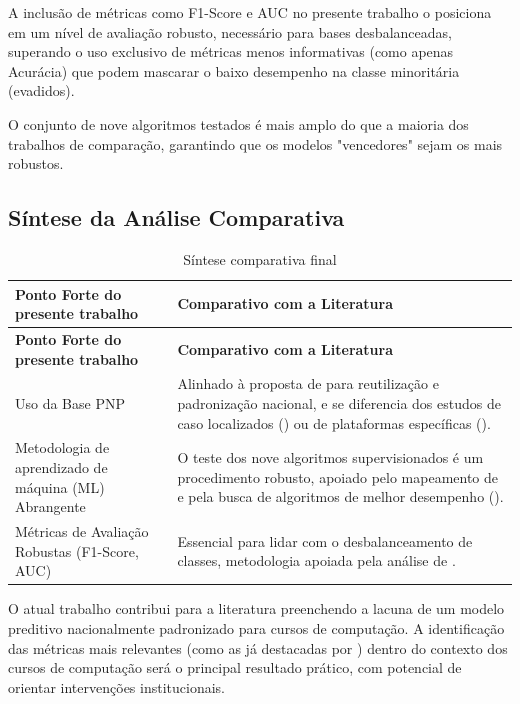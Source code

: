 \documentclass[english, spanish, brazilian]{RBIEarticle} %
\begin{document}
A inclusão de métricas como F1-Score e AUC no presente trabalho o posiciona em um nível de avaliação robusto, necessário para bases desbalanceadas, superando o uso exclusivo de métricas menos informativas (como apenas Acurácia) que podem mascarar o baixo desempenho na classe minoritária (evadidos).

O conjunto de nove algoritmos testados é mais amplo do que a maioria dos trabalhos de comparação, garantindo que os modelos "vencedores" sejam os mais robustos.


\subsection{Síntese da Análise Comparativa}

\begin{longtable}{|p{7cm}|p{8cm}|}
    \caption{Síntese comparativa final}\\
    \toprule
    \textbf{Ponto Forte do presente trabalho} & \textbf{Comparativo com a Literatura} \\
    \midrule
    \endfirsthead
    \toprule
    \textbf{Ponto Forte do presente trabalho} & \textbf{Comparativo com a Literatura} \\
    \midrule
    \endhead
    Uso da Base PNP & Alinhado à proposta de \cite{jesus2024dissertacao} para reutilização e padronização nacional, e se diferencia dos estudos de caso localizados (\cite{ramos2018comparativo}) ou de plataformas específicas (\cite{tamada2025predicting}). \\ \hline

    Metodologia de aprendizado de máquina (ML) Abrangente & O teste dos nove algoritmos supervisionados é um procedimento robusto, apoiado pelo mapeamento de \cite{jesus2024mapeamento} e pela busca de algoritmos de melhor desempenho (\cite{andradegiron2023predicting}). \\ \hline
    
    Métricas de Avaliação Robustas (F1-Score, AUC) & Essencial para lidar com o desbalanceamento de classes, metodologia apoiada pela análise de \cite{neves2024ficare}. \\
    \bottomrule
\end{longtable}

O atual trabalho contribui para a literatura preenchendo a lacuna de um modelo preditivo nacionalmente padronizado para cursos de computação. A identificação das métricas mais relevantes (como as já destacadas por \cite{jesus2024mapeamento}) dentro do contexto dos cursos de computação será o principal resultado prático, com potencial de orientar intervenções institucionais.
\end{document}
